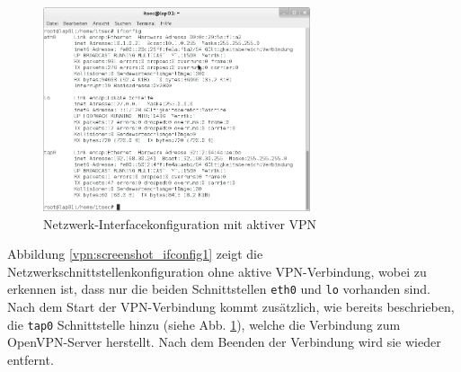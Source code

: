 \begin{figure}[h!]
  \centering
    \includegraphics[width=0.7\textwidth]{figures/vpn_ifconfig_lap01_vpn.png}
  \caption{Netzwerk-Interfacekonfiguration mit aktiver VPN}
  \label{vpn:screenshot_ifconfig2}
\end{figure}


Abbildung \ref{vpn:screenshot_ifconfig1} zeigt die Netzwerkschnittstellenkonfiguration ohne aktive VPN-Verbindung, wobei zu erkennen ist, dass nur die beiden Schnittstellen \texttt{eth0} und \texttt{lo} vorhanden sind. Nach dem Start der VPN-Verbindung kommt zusätzlich, wie bereits beschrieben, die \texttt{tap0} Schnittstelle hinzu (siehe Abb. \ref{vpn:screenshot_ifconfig2}), welche die Verbindung zum OpenVPN-Server herstellt. Nach dem Beenden der Verbindung wird sie wieder entfernt.